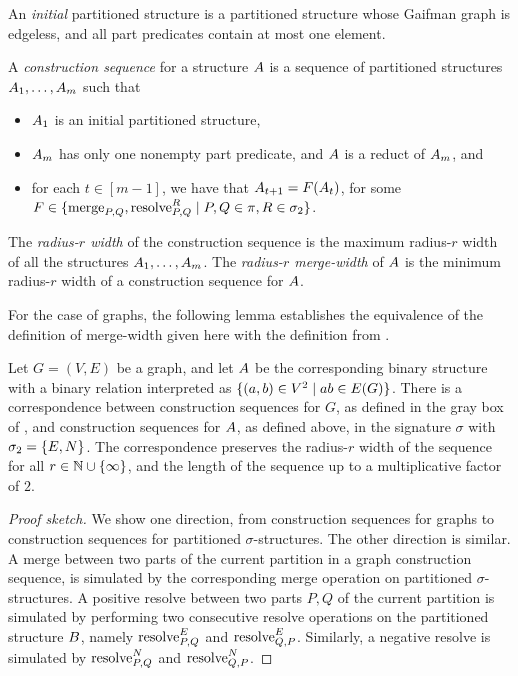 \begin{definition}
An \emph{initial} partitioned structure
is a partitioned structure whose Gaifman graph is edgeless, 
and all part predicates contain at most one element.

  A \emph{construction sequence} for a structure ${{A}}$
  is a sequence of partitioned structures ${{A}}_1,\ldots,{{A}}_m$
  such that
  \begin{itemize}
    \item ${{A}}_1$ is an initial partitioned structure,  
    \item ${{A}}_m$ has only one nonempty part predicate, and  ${{A}}$ is a reduct of ${{A}}_m$, and
\item for each $t\in[m-1]$, we have that ${{A}}_{t+1}=F({{A}}_t)$, for 
some $F\in\{\mathrm{merge}_{P,Q},\mathrm{resolve}^{R}_{P,Q}\mid P,Q\in\pi,R\in \sigma_2\}$.
  \end{itemize}
  The \emph{radius-$r$ width} of the construction sequence is the maximum 
  radius-$r$ width of all the structures ${{A}}_1,\ldots,{{A}}_m$.
  The \emph{radius-$r$ merge-width} of ${{A}}$ is the minimum 
  radius-$r$ width of a construction sequence for ${{A}}$.
\end{definition}

For the case of graphs,
the following lemma establishes the equivalence of the definition of merge-width given here
with the definition from .

\begin{lemma}\label{lem:construction-construction}
  Let $G=(V,E)$ be a graph, and let ${{A}}$ be the corresponding binary structure with a binary relation interpreted as $\{(a,b)\in V^2\mid ab\in E(G)\}$.
There is a correspondence between construction sequences for $G$, as defined 
  in the gray box of , and construction sequences for ${{A}}$, as defined above, in the signature $\sigma$ with $\sigma_2=\{E,N\}$.
  The correspondence preserves the radius-$r$ width of the sequence for all \(r \in \mathbb N \cup \{\infty\}\), and the length of the sequence up to a multiplicative factor of $2$.
\end{lemma}
\begin{proof}[Proof sketch]
  We show one direction, from construction sequences for graphs to construction sequences for partitioned $\sigma$-structures.
  The other direction is similar.
A merge between two parts of the current partition in a graph construction sequence,
is simulated by the corresponding merge operation on partitioned $\sigma$-structures.
A positive resolve between two parts $P,Q$ of the current partition 
is simulated by performing two consecutive resolve operations on the partitioned structure ${{B}}$,
namely $\mathrm{resolve}^{E}_{P,Q}$ and $\mathrm{resolve}^{E}_{Q,P}$.
Similarly, a negative resolve is simulated by $\mathrm{resolve}^{N}_{P,Q}$ and $\mathrm{resolve}^{N}_{Q,P}$.
\end{proof}


